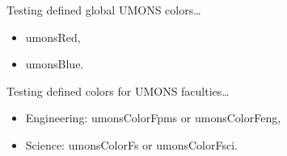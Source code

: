 \documentclass{minimal}
\begin{document}
	Testing defined global UMONS colors\ldots
	\begin{itemize}
		\item \textcolor{umonsRed}{umonsRed},
		\item \textcolor{umonsBlue}{umonsBlue}.
	\end{itemize}
	
	Testing defined colors for UMONS faculties\ldots
	\begin{itemize}
		\item Engineering: \textcolor{umonsColorFpms}{umonsColorFpms} or \textcolor{umonsColorFeng}{umonsColorFeng},
		\item Science: \textcolor{umonsColorFs}{umonsColorFs} or \textcolor{umonsColorFsci}{umonsColorFsci}.
	\end{itemize}
\end{document}
